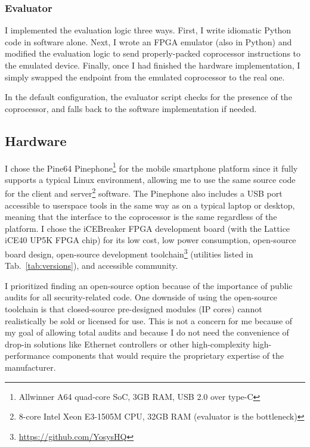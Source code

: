\subsubsection{Evaluator}
I implemented the evaluation logic three ways. First, I write idiomatic Python code in software alone. Next, I wrote an FPGA emulator (also in Python) and modified the evaluation logic to send properly-packed coprocessor instructions to the emulated device. Finally, once I had finished the hardware implementation, I simply swapped the endpoint from the emulated coprocessor to the real one.

In the default configuration, the evaluator script checks for the presence of the coprocessor, and falls back to the software implementation if needed.

\subsection{Hardware}\label{sec:hw}
I chose the Pine64 Pinephone\cite{Pinephone}\footnote{Allwinner A64 quad-core SoC, 3GB RAM, USB 2.0 over type-C} for the mobile smartphone platform since it fully supports a typical Linux environment, allowing me to use the same source code for the client and server\footnote{8-core Intel Xeon E3-1505M CPU, 32GB RAM (evaluator is the bottleneck)} software. The Pinephone also includes a USB port accessible to userspace tools in the same way as on a typical laptop or desktop, meaning that the interface to the coprocessor is the same regardless of the platform. I chose the iCEBreaker FPGA development board\cite{iCEBreaker} (with the Lattice iCE40 UP5K FPGA chip\cite{LatticePage}) for its low cost, low power consumption, open-source board design, open-source development toolchain\footnote{\url{https://github.com/YosysHQ}} (utilities listed in Tab.~\ref{tab:versions}), and accessible community.

I prioritized finding an open-source option because of the importance of public audits for all security-related code. One downside of using the open-source toolchain is that closed-source pre-designed modules (IP cores) cannot realistically be sold or licensed for use. This is not a concern for me because of my goal of allowing total audits and because I do not need the convenience of drop-in solutions like Ethernet controllers or other high-complexity high-performance components that would require the proprietary expertise of the manufacturer.

